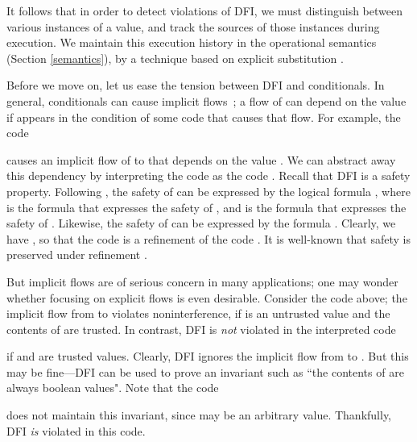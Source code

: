 \documentclass{sigplanconf}
\begin{document}
It follows that in order to detect violations of DFI, we must distinguish between various instances of a value, and track the sources of those instances during execution. 
We maintain this execution history in
the operational semantics (Section \ref{semantics}), by a technique based on explicit substitution \cite{abadi90explicit}. 

Before we move on, let us ease the tension between DFI and conditionals. In general, conditionals can cause implicit flows~\cite{denningcert}; a flow of  can depend on the value  if  appears in the condition of some code that causes that flow. For example, the code

causes an implicit flow of  to  that depends on the value . We can abstract away this dependency by interpreting the code  as the code . Recall that DFI is a safety property. Following \cite{lamport77}, the safety of  can be expressed by the logical formula , where  is the formula that expresses the safety of , and  is the formula that expresses the safety of . Likewise, the safety of  can be expressed by the formula . Clearly, we have  , so that the code  is a refinement of the code . It is well-known that safety is preserved under refinement \cite{lamport77}.

But implicit flows are of serious concern in many applications; one may wonder whether focusing on explicit flows is even desirable. Consider the code above; the implicit flow from  to  violates noninterference, if  is an untrusted value and the contents of  are trusted. In contrast, DFI is \emph{not} violated in the interpreted code 

if  and  are trusted values. Clearly, DFI ignores the implicit flow from  to . But this may be fine---DFI can be used to prove an invariant such as ``the contents of  are always boolean values". Note that the code

does not maintain this invariant, since  may be an arbitrary value. Thankfully, DFI \emph{is} violated in this code. 
\end{document}
